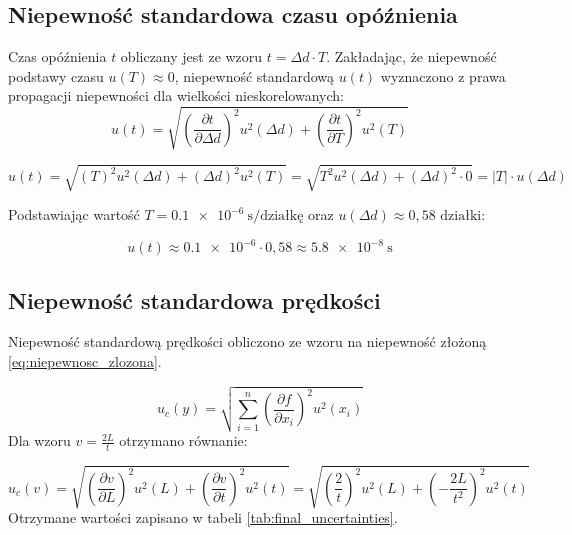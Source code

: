 \documentclass[a4paper,12pt]{article}
\begin{document}
\subsection{Niepewność standardowa czasu opóźnienia}

Czas opóźnienia \( t \) obliczany jest ze wzoru \( t = \Delta d \cdot T \). Zakładając, że niepewność podstawy czasu \( u(T) \approx 0 \), niepewność standardową \( u(t) \) wyznaczono z prawa propagacji niepewności dla wielkości nieskorelowanych:
$$
    u(t) = \sqrt{ \left(\frac{\partial t}{\partial \Delta d}\right)^2 u^2(\Delta d) + \left(\frac{\partial t}{\partial T}\right)^2 u^2(T) }
$$

$$
    u(t) = \sqrt{ \left( T \right)^2 u^2(\Delta d) + \left( \Delta d \right)^2 u^2(T) }
    =  \sqrt{ T^2 u^2(\Delta d) + (\Delta d)^2 \cdot 0 } = |T| \cdot u(\Delta d)
$$

Podstawiając wartość \( T = \SI{0.1e-6}{\second/\text{działkę}} \) oraz \( u(\Delta d) \approx 0{,}58 \text{ działki} \):

$$
    u(t) \approx \num{0.1e-6} \cdot 0{,}58  \approx \SI{5.8e-8}{\second}
$$

\subsection{Niepewność standardowa prędkości}

Niepewność standardową prędkości obliczono ze wzoru na niepewność złożoną \eqref{eq:niepewnosc_zlozona}.

\begin{equation}
    \label{eq:niepewnosc_zlozona}
    u_c(y) = \sqrt{ \sum_{i=1}^{n} \left(\frac{\partial f}{\partial x_i}\right)^2 u^2(x_i) }
\end{equation}
Dla wzoru $v = \frac{2L}{t}$ otrzymano równanie:

\begin{equation*}
    u_c(v) = \sqrt{ \left(\frac{\partial v}{\partial L}\right)^2 u^2(L) + \left(\frac{\partial v}{\partial t}\right)^2 u^2(t) } = \sqrt{ \left(\frac{2}{t}\right)^2 u^2(L) + \left(-\frac{2L}{t^2}\right)^2 u^2(t) }
\end{equation*}
Otrzymane wartości zapisano w tabeli \ref{tab:final_uncertainties}.
\end{document}
